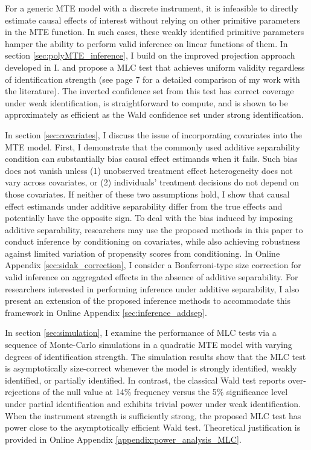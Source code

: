 \documentclass[11pt]{article}
\theoremstyle{definition}
\newcommand{\0}{\ensuremath{\mathbf{0}}}
\begin{document}
\begin{bibunit}
For a generic MTE model with a discrete instrument, it is infeasible to directly estimate causal effects of interest without relying on other primitive parameters in the MTE function. In such cases, these weakly identified primitive parameters hamper the ability to perform valid inference on linear functions of them. In section \ref{sec:polyMTE_inference}, I build on the improved projection approach developed in I. \citet{andrews.i:2018} and propose a MLC test that achieves uniform validity regardless of identification strength (see page 7 for a detailed comparison of my work with the literature). The inverted confidence set from this test has correct coverage under weak identification, is straightforward to compute, and is shown to be approximately as efficient as the Wald confidence set under strong identification.

In section \ref{sec:covariates}, I discuss the issue of incorporating covariates into the MTE model. First, I demonstrate that the commonly used additive separability condition can substantially bias causal effect estimands when it fails. Such bias does not vanish unless (1) unobserved treatment effect heterogeneity does not vary across covariates, or (2) individuals' treatment decisions do not depend on those covariates. If neither of these two assumptions hold, I show that causal effect estimands under additive separability differ from the true effects and potentially have the opposite sign. To deal with the bias induced by imposing additive separability, researchers may use the proposed methods in this paper to conduct inference by conditioning on covariates, while also achieving robustness against limited variation of propensity scores from conditioning. In Online Appendix \ref{sec:sidak_correction}, I consider a Bonferroni-type size correction for valid inference on aggregated effects in the absence of additive separability. For researchers interested in performing inference under additive separability, I also present an extension of the proposed inference methods to accommodate this framework in Online Appendix \ref{sec:inference_addsep}.

In section \ref{sec:simulation}, I examine the performance of MLC tests via a sequence of Monte-Carlo simulations in a quadratic MTE model with varying degrees of identification strength. The simulation results show that the MLC test is asymptotically size-correct whenever the model is strongly identified, weakly identified, or partially identified. In contrast, the classical Wald test reports over-rejections of the null value at 14\% frequency versus the 5\% significance level under partial identification and exhibits trivial power under weak identification. When the instrument strength is sufficiently strong, the proposed MLC test has power close to the asymptotically efficient Wald test. Theoretical justification is provided in Online Appendix \ref{appendix:power_analysis_MLC}.


\end{bibunit}
\end{document}

